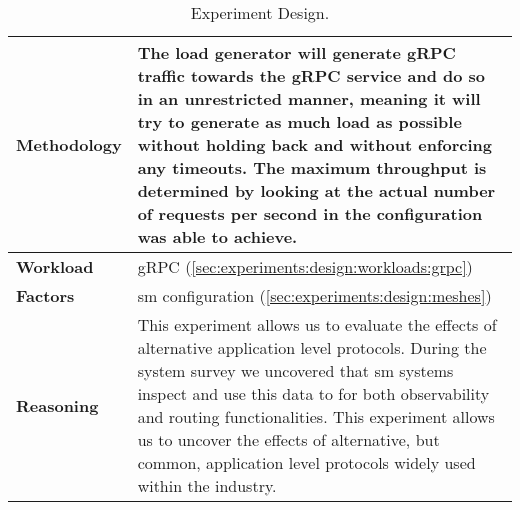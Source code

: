 \begin{table}[!t]
\begin{tabularx}{\textwidth}{l X}
        \textbf{Methodology}
        & The load generator will generate gRPC traffic towards the gRPC service and do so in an unrestricted manner, meaning it will try to generate as much load as possible without holding back and without enforcing any timeouts. The maximum throughput is determined by looking at the actual number of requests per second in the configuration was able to achieve. \\
        \midrule
        
        \textbf{Workload} 
        & gRPC (\cref{sec:experiments:design:workloads:grpc}) \\
        \midrule

        \multirow{1}{*}{\textbf{Factors}} 
        & \Gls{sm} configuration (\cref{sec:experiments:design:meshes}) \\
        \midrule
        
        \textbf{Reasoning}
        & This experiment allows us to evaluate the effects of alternative application level protocols. During the system survey we uncovered that \gls{sm} systems inspect and use this data to for both observability and routing functionalities. This experiment allows us to uncover the effects of alternative, but common, application level protocols widely used within the industry. \\

        \bottomrule

    \end{tabularx}
    \caption[Experiment Design.]{Experiment Design.}
    \label{tab:experiment:overview}
\end{table}